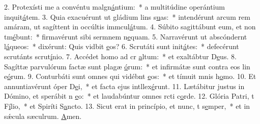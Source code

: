 2. Protexísti me a convéntu malgn\uline{á}ntium:~* a multitúdine operántium inquit\uline{á}tem.
3. Quia exacuérunt ut gládium lins s\uline{u}as:~* intendérunt arcum rem amáram, ut sagíttent in occúltis immcul\uline{á}tum.
4. Súbito sagittábunt eum, et non tm\uline{é}bunt:~* firmavérunt sibi sermnem n\uline{e}quam.
5. Narravérunt ut abscóndernt l\uline{á}queos:~* dixérunt: Quis vidbit \uline{e}os?
6. Scrutáti sunt init\uline{á}tes:~* defecérunt scrutánts scrut\uline{í}nio.
7. Accédet homo ad cr \uline{a}ltum:~* et exaltábtur D\uline{e}us.
8. Sagíttæ parvulórum factæ sunt plagæ \uline{ó}rum:~* et infirmátæ sunt contra eos lin e\uline{ó}rum.
9. Conturbáti sunt omnes qui vidébnt \uline{e}os:~* et tímuit mnis h\uline{o}mo.
10. Et annuntiavérunt óper D\uline{e}i,~* et facta ejus intllex\uline{é}runt.
11. Lætábitur justus in Dómino, et sperábit n \uline{e}o:~* et laudabúntur omnes rcti c\uline{o}rde.
12. Glória Patri, t F\uline{í}lio,~* et Spiríti S\uline{a}ncto.
13. Sicut erat in princípio, et nunc, t s\uline{e}mper,~* et in sǽcula sæculrum. \uline{A}men.
